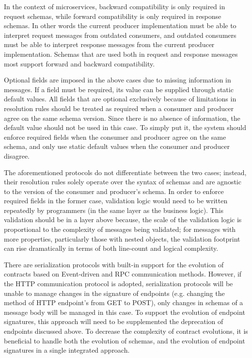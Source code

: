 In the context of microservices, backward compatibility is only required in request schemas, while forward compatibility is only required in response schemas.
In other words the current producer implementation must be able to interpret request messages from outdated consumers, and outdated consumers
must be able to interpret response messages from the current producer implementation.
Schemas that are used both in request and response messages most support forward and backward compatibility.

Optional fields are imposed in the above cases due to missing information in messages.
If a field must be required, its value can be supplied through static default values.
All fields that are optional exclusively because of limitations in resolution rules should be treated as required when a consumer and producer agree on the same schema version.
Since there is no absence of information, the default value should not be used in this case.
To simply put it, the system should enforce required fields when the consumer and producer agree on the same schema, and only use static default values when the consumer and producer disagree.

The aforementioned protocols do not differentiate between the two cases; instead, their resolution rules solely operate over the syntax of schemas and are agnostic to the version of the consumer and producer's schema.
In order to enforce required fields in the former case,
validation logic would need to be written repeatedly by programmers (in the same layer as the business logic).
This validation should be in a layer above because, the scale of the validation logic is proportional to the complexity of messages being validated;
for messages with more properties, particularly those with nested objects, the validation footprint can rise dramatically in terms of both line-count and logical complexity.

There are serialization protocols with built-in support for the evolution of contracts based on Event-driven and RPC communication methods.
However, if the HTTP communication protocol is adopted, serialization protocols will be unable to manage changes in the signature of endpoints (e.g. changing the method of HTTP endpoint's from GET to POST),
only changes in schemas of a message body will be managed in this case.
To support the evolution of endpoint signatures, this approach will need to be supplemented the deprecation of endpoints discussed above.
To decrease the complexity of contract evolutions, it is beneficial to handle both the evolution of schemas, and the evolution of endpoint signatures in a single integrated approach.

